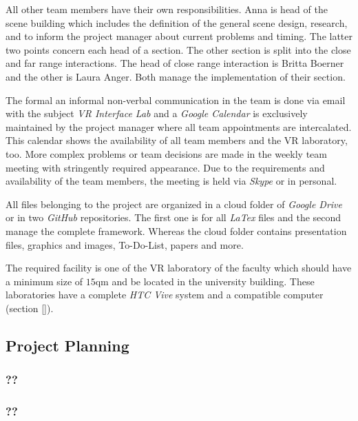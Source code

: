 All other team members have their own responsibilities. Anna is head of the scene building which includes the definition of the general scene design, research, and to inform the project manager about current problems and timing. The latter two points concern each head of a section. The other section is split into the close and far range interactions. The head of close range interaction is Britta Boerner and the other is Laura Anger. Both manage the implementation of their section.

The formal an informal non-verbal communication in the team is done via email with the subject \textit{VR Interface Lab} and a \textit{Google Calendar} is exclusively maintained by the project manager where all team appointments are intercalated. This calendar shows the availability of all team members and the VR laboratory, too. More complex problems or team decisions are made in the weekly team meeting with stringently required appearance. Due to the requirements and availability of the team members, the meeting is held via \textit{Skype} or in personal.

All files belonging to the project are organized in a cloud folder of \textit{Google Drive} or in two \textit{GitHub} repositories. The first one is for all \textit{LaTex} files and the second manage the complete framework. Whereas the cloud folder contains presentation files, graphics and images, To-Do-List, papers and more.

The required facility is one of the VR laboratory of the faculty which should have a minimum size of $15$qm and be located in the university building. These laboratories have a complete \textit{HTC Vive}
system and a compatible computer (section \ref{}).




\subsection{Project Planning} \label{sec:ProjectPlanning}

\subsubsection{??}\label{sec:??}

\subsubsection{??}\label{sec:??}




